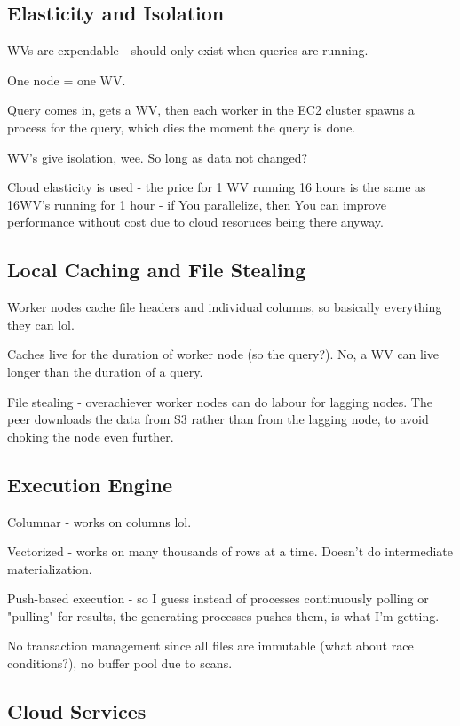 \documentclass{article}
\begin{document}
		
	\subsection{Elasticity and Isolation}
	
		WVs are expendable - should only exist when queries are running.
		
		One node = one WV.
		
		Query comes in, gets a WV, then each worker in the EC2 cluster spawns a process for the query, which dies the moment the query is done.
		
		WV's give isolation, wee. So long as data not changed?
		
		Cloud elasticity is used - the price for 1 WV running 16 hours is the same as 16WV's running for 1 hour - if You parallelize, then You can improve performance without cost due to cloud resoruces being there anyway.
		
	\subsection{Local Caching and File Stealing}
	
		Worker nodes cache file headers and individual columns, so basically everything they  can lol.
		
		Caches live for the duration of worker node (so the query?). No, a WV can live longer than the duration of a query.
		
		File stealing - overachiever worker nodes can do labour for lagging nodes. The peer downloads the data from S3 rather than from the lagging node, to avoid choking the node even further.
		
	\subsection{Execution Engine}
	
		Columnar - works on columns lol.
		
		Vectorized - works on many thousands of rows at a time. Doesn't do intermediate materialization.
		
		Push-based execution - so I guess instead of processes continuously polling or "pulling" for results, the generating processes pushes them, is what I'm getting.
		
		No transaction management since all files are immutable (what about race conditions?), no buffer pool due to scans.
	
	\subsection{Cloud Services}
	
\end{document}

